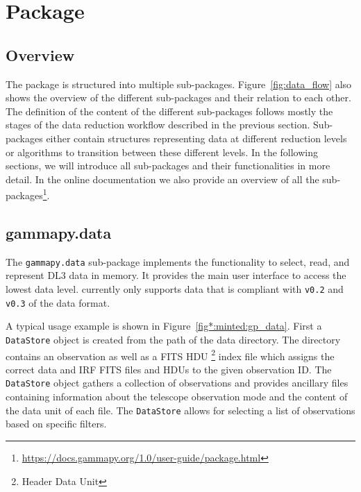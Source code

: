 \documentclass[longauth]{aa}
\newcommand{\code}[1]{\texttt{#1}}
\begin{document}
 
 
 
 
 

\section{\gammapy Package}
\label{sec:gammapy-package}
\subsection{Overview}
\label{ssec:overview}
%
The \gammapy package is structured into multiple sub-packages. 
Figure~\ref{fig:data_flow} also shows the overview of the different sub-packages and
their relation to each other. The definition
of the content of the different sub-packages follows mostly the stages of the
data reduction workflow described in the previous section. Sub-packages either
contain structures representing data at different reduction levels or algorithms
to transition between these different levels. In the following sections, we will
introduce all sub-packages and their functionalities in more detail. In the online 
documentation we also provide an overview of all the \gammapy sub-packages\footnote{\url{https://docs.gammapy.org/1.0/user-guide/package.html}}.


\subsection{gammapy.data}
\label{ssec:gammapy-data}
The \code{gammapy.data} sub-package implements the functionality to select,
read, and represent DL3 \gammaray data in memory. It provides the main user
interface to access the lowest data level. \gammapy currently only
supports data that is compliant with \code{v0.2} and \code{v0.3} of the \gadf data format.

A typical usage example is shown in Figure~\ref{fig*:minted:gp_data}.
First a \code{DataStore} object is created from the path of the data
directory. The directory contains an observation as well as a FITS HDU \footnote{Header Data Unit} 
index file which assigns the correct data and IRF FITS files and HDUs
to the given observation ID. The \code{DataStore}
object gathers a collection of observations and provides ancillary
files containing information about the telescope observation mode and the
content of the data unit of each file. The \code{DataStore} allows for
selecting a list of observations based on specific filters.
\end{document}

